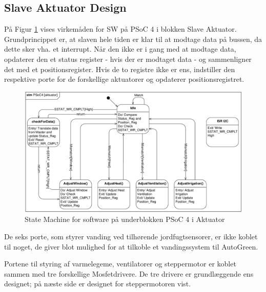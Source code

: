 \subsection{Slave Aktuator Design}
\label{ch:slave_aktuator_design}

På Figur \ref{fig:stm_psoc_aktuator} vises virkemåden for SW på PSoC 4 i blokken Slave Aktuator. 
Grundprincippet er, at slaven hele tiden er klar til at modtage data på \IIC bussen, da dette sker vha. et interrupt. 
Når den ikke er i gang med at modtage data, opdaterer den et status register - hvis der er modtaget data - og sammenligner det med et positionsregister. 
Hvis de to registre ikke er ens, indstiller den respektive porte for de forskellige aktuatorer og opdaterer positionsregistret. 

\begin{figure}[h]
\centering 
\includegraphics[width={\textwidth}, trim=0 0 0 0, clip=true] {../fig/stm_psoc_aktuator.pdf}
\caption{State Machine for software på underblokken PSoC 4 i Aktuator}
\label{fig:stm_psoc_aktuator}
\end{figure}

De seks porte, som styrer vanding ved tilhørende jordfugtsensorer, er ikke koblet til noget, de giver blot mulighed for at tilkoble et vandingssystem til AutoGreen.

Portene til styring af varmelegeme, ventilatorer og steppermotor er koblet sammen med tre forskellige Mosfetdrivere. 
De tre drivere er grundlæggende ens designet; på næste side er designet for steppermotoren vist. 

\clearpage

